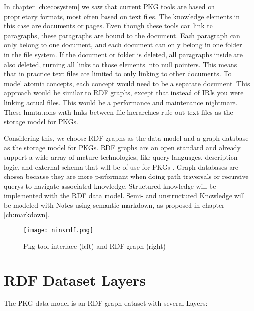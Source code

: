 In chapter \ref{ch:ecosystem} we saw that current PKG tools are based on proprietary formats, most often based on text files. The knowledge elements in this case are documents or pages. Even though these tools can link to paragraphs, these paragraphs are bound to the document. Each paragraph can only belong to one document, and each document can only belong in one folder in the file system. If the document or folder is deleted, all paragraphs inside are also deleted, turning all links to those elements into null pointers. This means that in practice text files are limited to only linking to other documents. To model atomic concepts, each concept would need to be a separate document. This approach would be similar to RDF graphs, except that instead of IRIs you were linking actual files. This would be a performance and maintenance nightmare. These limitations with links between file hierarchies rule out text files as the storage model for PKGs.

Considering this, we choose RDF graphs as the data model and a graph database as the storage model for PKGs. RDF graphs are an open standard and already support a wide array of mature technologies, like query languages, description logic, and external schema that will be of use for PKGs \cite{sparql, owl}. Graph databases are chosen because they are more performant when doing path traversals or recursive querys to navigate associated knowledge. Structured knowledge will be implemented with the RDF data model. Semi- and unstructured Knowledge will be modeled with Notes using semantic markdown, as proposed in chapter \ref{ch:markdown}.

\begin{figure}[h]
  \centering
  \texttt{[image: ninkrdf.png]}
  \caption{Pkg tool interface (left) and RDF graph (right)}
  \label{fig:ninkrdf}
  \end{figure}

\section{RDF Dataset Layers}

The PKG data model is an RDF graph dataset with several Layers:

